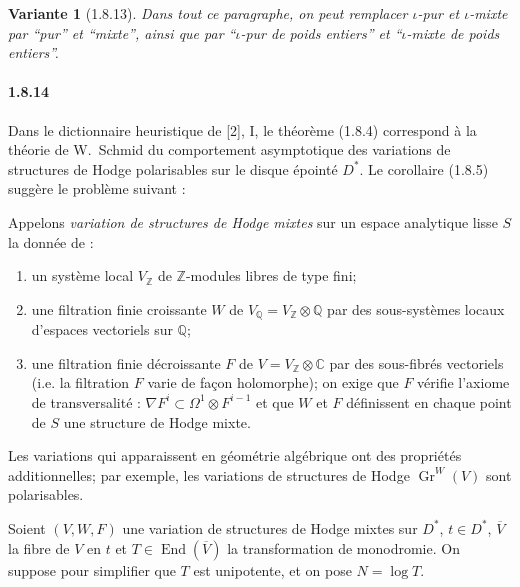 \documentclass[12pt,a4paper]{article}
\theoremstyle{plain}
\newtheorem{variante}[theorem]{Variante}
\theoremstyle{definition}
\theoremstyle{remark}
\DeclareMathOperator{\End}{End}
\DeclareMathOperator{\Gr}{Gr}
\newcommand{\CC}{{\mathbb{C}}}
\newcommand{\QQ}{{\mathbb{Q}}}
\newcommand{\ZZ}{{\mathbb{Z}}}
\begin{document}
\begin{variante}[1.8.13]
Dans tout ce paragraphe, on peut remplacer $\iota$-pur et $\iota$-mixte par ``pur'' et ``mixte'', ainsi que par ``$\iota$-pur de poids entiers'' et ``$\iota$-mixte de poids entiers''.
\end{variante}

\paragraph{1.8.14}
Dans le dictionnaire heuristique de [2], I, le th\'eor\`eme (1.8.4) correspond \`a la th\'eorie de W.~Schmid du comportement asymptotique des variations de structures de Hodge polarisables sur le disque \'epoint\'e $D^*$. Le corollaire (1.8.5) sugg\`ere le probl\`eme suivant :

Appelons \emph{variation de structures de Hodge mixtes} sur un espace analytique lisse $S$ la donn\'ee de :
\begin{enumerate}[label=\alph*)]
\item un syst\`eme local $V_\ZZ$ de $\ZZ$-modules libres de type fini;
\item une filtration finie croissante $W$ de $V_\QQ = V_\ZZ \otimes \QQ$ par des sous-syst\`emes locaux d'espaces vectoriels sur $\QQ$;
\item une filtration finie d\'ecroissante $F$ de $V = V_\ZZ \otimes \CC$ par des sous-fibr\'es vectoriels (i.e. la filtration $F$ varie de fa\c{c}on holomorphe); on exige que $F$ v\'erifie l'axiome de transversalit\'e : $\nabla F^i \subset \Omega^1 \otimes F^{i-1}$ et que $W$ et $F$ d\'efinissent en chaque point de $S$ une structure de Hodge mixte.
\end{enumerate}
Les variations qui apparaissent en g\'eom\'etrie alg\'ebrique ont des propri\'et\'es additionnelles; par exemple, les variations de structures de Hodge $\Gr^W(V)$ sont polarisables.

Soient $(V, W, F)$ une variation de structures de Hodge mixtes sur $D^*$, $t \in D^*$, $\overline{V}$ la fibre de $V$ en $t$ et $T \in \End(\overline{V})$ la transformation de monodromie. On suppose pour simplifier que $T$ est unipotente, et on pose $N = \log T$.
\end{document}
